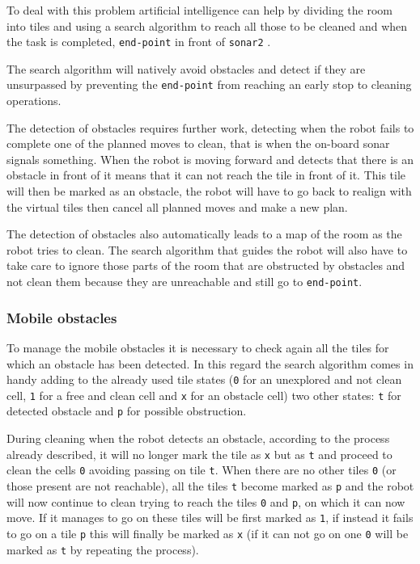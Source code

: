To deal with this problem artificial intelligence can help by dividing the room into tiles and using a search algorithm to reach all those to be cleaned and when the task is completed, \texttt{end-point} in front of \texttt{sonar2} .

The search algorithm will natively avoid obstacles and detect if they are unsurpassed by preventing the \texttt{end-point} from reaching an early stop to cleaning operations.

The detection of obstacles requires further work, detecting when the robot fails to complete one of the planned moves to clean, that is when the on-board sonar signals something. When the robot is moving forward and detects that there is an obstacle in front of it means that it can not reach the tile in front of it. This tile will then be marked as an obstacle, the robot will have to go back to realign with the virtual tiles then cancel all planned moves and make a new plan.

The detection of obstacles also automatically leads to a map of the room as the robot tries to clean. The search algorithm that guides the robot will also have to take care to ignore those parts of the room that are obstructed by obstacles and not clean them because they are unreachable and still go to \texttt{end-point}.

\subsubsection{Mobile obstacles}
To manage the mobile obstacles it is necessary to check again all the tiles for which an obstacle has been detected. In this regard the search algorithm comes in handy adding to the already used tile states (\texttt{0} for an unexplored and not clean cell, \texttt{1} for a free and clean cell and \texttt{x} for an obstacle cell) two other states: \texttt{t} for detected obstacle and \texttt{p} for possible obstruction.

During cleaning when the robot detects an obstacle, according to the process already described, it will no longer mark the tile as \texttt{x} but as \texttt{t} and proceed to clean the cells \texttt{0} avoiding passing on tile \texttt{t}. When there are no other tiles \texttt{0} (or those present are not reachable), all the tiles \texttt{t} become marked as \texttt{p} and the robot will now continue to clean trying to reach the tiles \texttt{0} and \texttt{p}, on which it can now move. If it manages to go on these tiles will be first marked as \texttt{1}, if instead it fails to go on a tile \texttt{p} this will finally be marked as \texttt{x} (if it can not go on one \texttt{0} will be marked as \texttt{t} by repeating the process).

